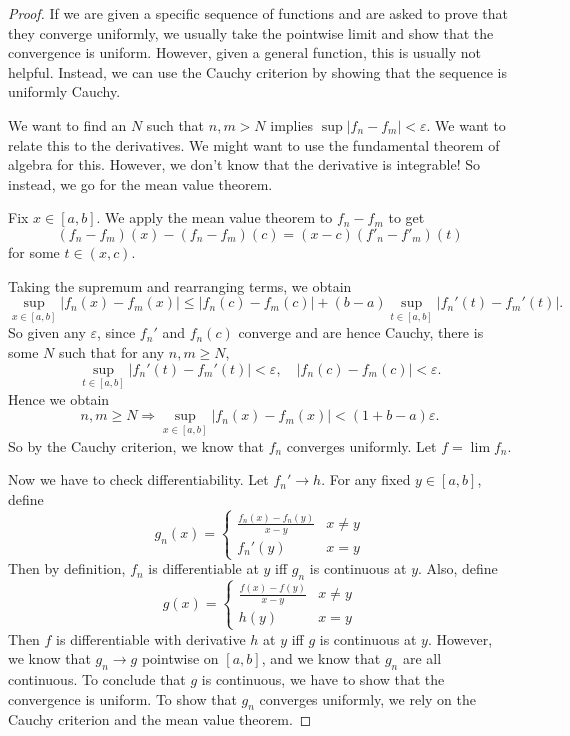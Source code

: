 \documentclass[a4paper]{article}
\begin{document}
\begin{proof}
  If we are given a specific sequence of functions and are asked to prove that they converge uniformly, we usually take the pointwise limit and show that the convergence is uniform. However, given a general function, this is usually not helpful. Instead, we can use the Cauchy criterion by showing that the sequence is uniformly Cauchy.

  We want to find an $N$ such that $n, m> N$ implies $\sup|f_n - f_m| < \varepsilon$. We want to relate this to the derivatives. We might want to use the fundamental theorem of algebra for this. However, we don't know that the derivative is integrable! So instead, we go for the mean value theorem.

  Fix $x\in [a, b]$. We apply the mean value theorem to $f_n - f_m$ to get
  \[
    (f_n - f_m)(x) - (f_n - f_m)(c) = (x - c)(f'_n - f'_m)(t)
  \]
  for some $t\in (x, c)$.

  Taking the supremum and rearranging terms, we obtain
  \[
    \sup_{x\in [a, b]}|f_n(x) - f_m(x)| \leq |f_n(c) - f_m(c)| + (b - a)\sup_{t\in [a, b]}|f_n'(t) - f_m'(t)|.
  \]
  So given any $\varepsilon$, since $f_n'$ and $f_n(c)$ converge and are hence Cauchy, there is some $N$ such that for any $n, m \geq N$,
  \[
    \sup_{t \in [a, b]} |f_n'(t) - f_m'(t)| < \varepsilon, \quad |f_n(c) - f_m(c)| < \varepsilon.
  \]
  Hence we obtain
  \[
    n, m \geq N \Rightarrow \sup_{x\in [a, b]}|f_n(x) - f_m(x)| < (1 + b - a) \varepsilon.
  \]
  So by the Cauchy criterion, we know that $f_n$ converges uniformly. Let $f = \lim f_n$.

  Now we have to check differentiability. Let $f_n' \to h$. For any fixed $y\in [a, b]$, define
  \[
    g_n(x) =
    \begin{cases}
      \frac{f_n(x) - f_n(y)}{x - y} & x \not= y\\
      f_n'(y) & x = y
    \end{cases}
  \]
  Then by definition, $f_n$ is differentiable at $y$ iff $g_n$ is continuous at $y$. Also, define
  \[
    g(x) =
    \begin{cases}
      \frac{f(x) - f(y)}{x - y} & x \not= y\\
      h(y) & x = y
    \end{cases}
  \]
  Then $f$ is differentiable with derivative $h$ at $y$ iff $g$ is continuous at $y$. However, we know that $g_n \to g$ pointwise on $[a, b]$, and we know that $g_n$ are all continuous. To conclude that $g$ is continuous, we have to show that the convergence is uniform. To show that $g_n$ converges uniformly, we rely on the Cauchy criterion and the mean value theorem.


\end{proof}
\end{document}
